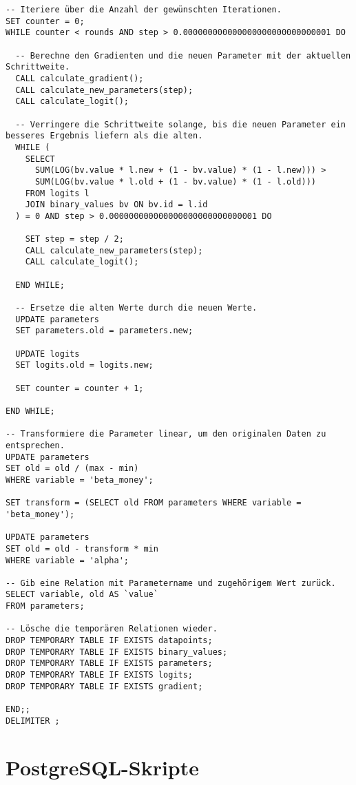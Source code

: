 \begin{verbatim}
-- Iteriere über die Anzahl der gewünschten Iterationen.
SET counter = 0;
WHILE counter < rounds AND step > 0.000000000000000000000000000001 DO

  -- Berechne den Gradienten und die neuen Parameter mit der aktuellen Schrittweite.
  CALL calculate_gradient();
  CALL calculate_new_parameters(step);
  CALL calculate_logit();

  -- Verringere die Schrittweite solange, bis die neuen Parameter ein besseres Ergebnis liefern als die alten.
  WHILE (
    SELECT
      SUM(LOG(bv.value * l.new + (1 - bv.value) * (1 - l.new))) >
      SUM(LOG(bv.value * l.old + (1 - bv.value) * (1 - l.old)))
    FROM logits l
    JOIN binary_values bv ON bv.id = l.id
  ) = 0 AND step > 0.000000000000000000000000000001 DO

    SET step = step / 2;
    CALL calculate_new_parameters(step);
    CALL calculate_logit();

  END WHILE;

  -- Ersetze die alten Werte durch die neuen Werte.
  UPDATE parameters
  SET parameters.old = parameters.new;

  UPDATE logits
  SET logits.old = logits.new;

  SET counter = counter + 1;

END WHILE;

-- Transformiere die Parameter linear, um den originalen Daten zu entsprechen.
UPDATE parameters
SET old = old / (max - min)
WHERE variable = 'beta_money';

SET transform = (SELECT old FROM parameters WHERE variable = 'beta_money');

UPDATE parameters
SET old = old - transform * min
WHERE variable = 'alpha';

-- Gib eine Relation mit Parametername und zugehörigem Wert zurück.
SELECT variable, old AS `value`
FROM parameters;

-- Lösche die temporären Relationen wieder.
DROP TEMPORARY TABLE IF EXISTS datapoints;
DROP TEMPORARY TABLE IF EXISTS binary_values;
DROP TEMPORARY TABLE IF EXISTS parameters;
DROP TEMPORARY TABLE IF EXISTS logits;
DROP TEMPORARY TABLE IF EXISTS gradient;

END;;
DELIMITER ;
\end{verbatim}

\chapter{PostgreSQL-Skripte}
\label{appendix:E}

